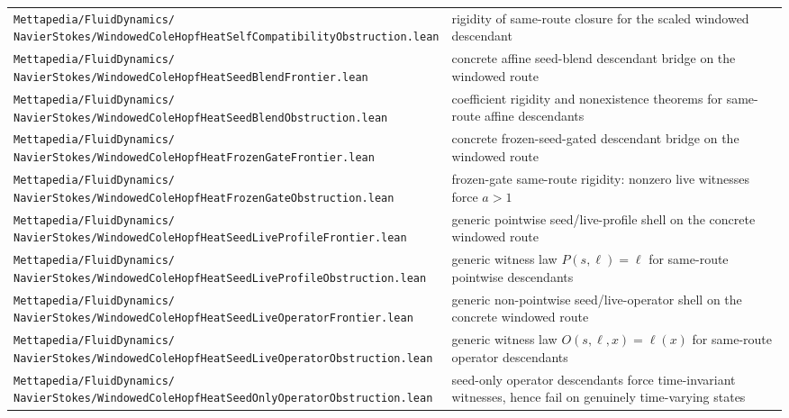 \documentclass[11pt]{article}
\theoremstyle{remark}
\begin{document}
\begin{center}
\begin{tabular}{p{}p{}}
\shortstack[l]{\texttt{Mettapedia/FluidDynamics/}\\\texttt{NavierStokes/WindowedColeHopfHeatSelfCompatibilityObstruction.lean}} & rigidity of same-route closure for the scaled windowed descendant \\
\shortstack[l]{\texttt{Mettapedia/FluidDynamics/}\\\texttt{NavierStokes/WindowedColeHopfHeatSeedBlendFrontier.lean}} & concrete affine seed-blend descendant bridge on the windowed route \\
\shortstack[l]{\texttt{Mettapedia/FluidDynamics/}\\\texttt{NavierStokes/WindowedColeHopfHeatSeedBlendObstruction.lean}} & coefficient rigidity and nonexistence theorems for same-route affine descendants \\
\shortstack[l]{\texttt{Mettapedia/FluidDynamics/}\\\texttt{NavierStokes/WindowedColeHopfHeatFrozenGateFrontier.lean}} & concrete frozen-seed-gated descendant bridge on the windowed route \\
\shortstack[l]{\texttt{Mettapedia/FluidDynamics/}\\\texttt{NavierStokes/WindowedColeHopfHeatFrozenGateObstruction.lean}} & frozen-gate same-route rigidity: nonzero live witnesses force \(a>1\) \\
\shortstack[l]{\texttt{Mettapedia/FluidDynamics/}\\\texttt{NavierStokes/WindowedColeHopfHeatSeedLiveProfileFrontier.lean}} & generic pointwise seed/live-profile shell on the concrete windowed route \\
\shortstack[l]{\texttt{Mettapedia/FluidDynamics/}\\\texttt{NavierStokes/WindowedColeHopfHeatSeedLiveProfileObstruction.lean}} & generic witness law \(P(s,\ell)=\ell\) for same-route pointwise descendants \\
\shortstack[l]{\texttt{Mettapedia/FluidDynamics/}\\\texttt{NavierStokes/WindowedColeHopfHeatSeedLiveOperatorFrontier.lean}} & generic non-pointwise seed/live-operator shell on the concrete windowed route \\
\shortstack[l]{\texttt{Mettapedia/FluidDynamics/}\\\texttt{NavierStokes/WindowedColeHopfHeatSeedLiveOperatorObstruction.lean}} & generic witness law \(O(s,\ell,x)=\ell(x)\) for same-route operator descendants \\
\shortstack[l]{\texttt{Mettapedia/FluidDynamics/}\\\texttt{NavierStokes/WindowedColeHopfHeatSeedOnlyOperatorObstruction.lean}} & seed-only operator descendants force time-invariant witnesses, hence fail on genuinely time-varying states \\

\end{tabular}
\end{center}
\end{document}
